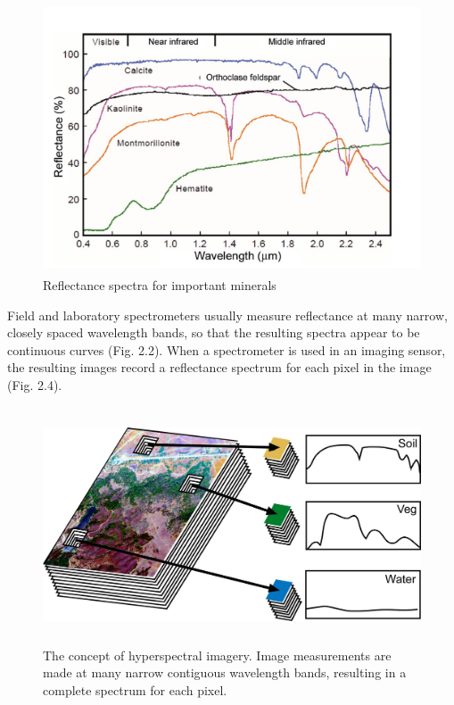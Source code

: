 \documentclass[document.tex]{subfiles}
\begin{document}
\begin{figure}[H]
	\begin{center}
		\includegraphics[height=8.0cm]{imgs/Minerals.png}
	\end{center}
	\caption{Reflectance spectra for important minerals\cite{35}}
	\label{fig: Reflectance spectra for important minerals}
\end{figure}
\noindent Field and laboratory spectrometers usually measure reflectance at many narrow,
closely spaced wavelength bands, so that the resulting spectra appear to be continuous curves (Fig. 2.2). When a spectrometer is used in an imaging sensor, the resulting
images record a reflectance spectrum for each pixel in the image (Fig. 2.4).
\begin{figure}[H]
	\begin{center}
		\includegraphics[height=7.0cm]{imgs/Hyperspectral_imagery.jpg}
	\end{center}
	\caption{The concept of hyperspectral imagery. Image measurements are made at
		many narrow contiguous wavelength bands, resulting in a complete spectrum for each
		pixel.\cite{35}}
	\label{fig: Hyperspectral imagery}
\end{figure}
\end{document}
